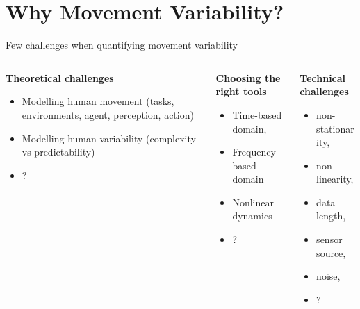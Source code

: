 \section{Why Movement Variability?}


{
\begin{frame}[fragile]{Few challenges when quantifying movement variability}
  \begin{columns}
   

 \begin{column}{.3\linewidth}
    
	\textbf{Theoretical challenges}
  \begin{itemize}
        \item Modelling human movement (tasks, environments, agent, perception, action)
        \item Modelling human variability (complexity vs predictability)
        \item ?
      \end{itemize}
    \end{column}

   \begin{column}{.3\linewidth}
	
	\textbf{Choosing the right tools} 
           \begin{itemize}
                \item Time-based domain,
		\item Frequency-based domain
		\item Nonlinear dynamics
                \item ?
              \end{itemize}
	\end{column}

   \begin{column}{.3\linewidth}
	\textbf{Technical challenges}
           \begin{itemize}
                \item non-stationarity, 
		\item non-linearity, 
		\item data length, 
		\item sensor source, 
		\item noise,
                \item ?
              \end{itemize}
	\end{column}



  \end{columns}


\end{frame}
}




